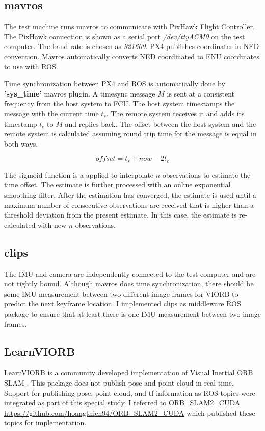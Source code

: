 \subsection{mavros}
The test machine runs mavros to communicate with PixHawk Flight Controller. 
The PixHawk connection is shown as a serial port \textit{/dev/ttyACM0} on the test computer. The baud rate is chosen as \textit{921600}.
PX4 publishes coordinates in NED convention. Mavros automatically converts NED coordinated to ENU coordinates to use with ROS.

Time synchronization between PX4 and ROS is automatically done by \textbf{'sys\_time'} mavros plugin.
A timesync message $M$ is sent at a consistent frequency from the host system to FCU. The host system timestamps the message with the current time $t_s$. The remote system receives it and adds its timestamp $t_c$ to $M$ and replies back.
The offset between the host system and the remote system is calculated assuming round trip time for the message is equal in both ways.

\begin{equation}
offset = t_s + now - 2t_c
\end{equation}

The sigmoid function is a applied to interpolate $n$ observations to estimate the time offset. The estimate is further processed with an online exponential smoothing filter.
After the estimation has converged, the estimate is used until a maximum number of consecutive observations are received that is higher than a threshold deviation from the present estimate. In this case, the estimate is re-calculated with new $n$ observations.

\subsection{clips}
The IMU and camera are independently connected to the test computer and are not tightly bound. Although mavros does time synchronization, there should be some IMU measurement between two different image frames for VIORB to predict the next keyframe location. 
I implemented clips as middleware ROS package to ensure that at least there is one IMU measurement between two image frames.

\subsection{LearnVIORB}
LearnVIORB is a community developed implementation of Visual Inertial ORB SLAM . This package does not publish pose and point cloud in real time. Support for publishing pose, point cloud, and tf information as ROS topics were integrated as part of this special study. 
I referred to ORB\_SLAM2\_CUDA \url{https://github.com/hoangthien94/ORB\_SLAM2\_CUDA} which published these topics for implementation.

